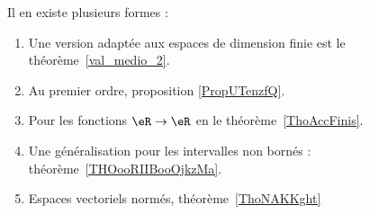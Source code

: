 
    Il en existe plusieurs formes :
    \begin{enumerate}
        \item
            Une version adaptée aux espaces de dimension finie est le théorème~\ref{val_medio_2}.
        \item
            Au premier ordre, proposition \ref{PropUTenzfQ}.
        \item
            Pour les fonctions \( \eR\to \eR\) en le théorème~\ref{ThoAccFinis}.
        \item
            Une généralisation pour les intervalles non bornés : théorème~\ref{THOooRIIBooOjkzMa}.
        \item
            Espaces vectoriels normés, théorème~\ref{ThoNAKKght}
    \end{enumerate}
